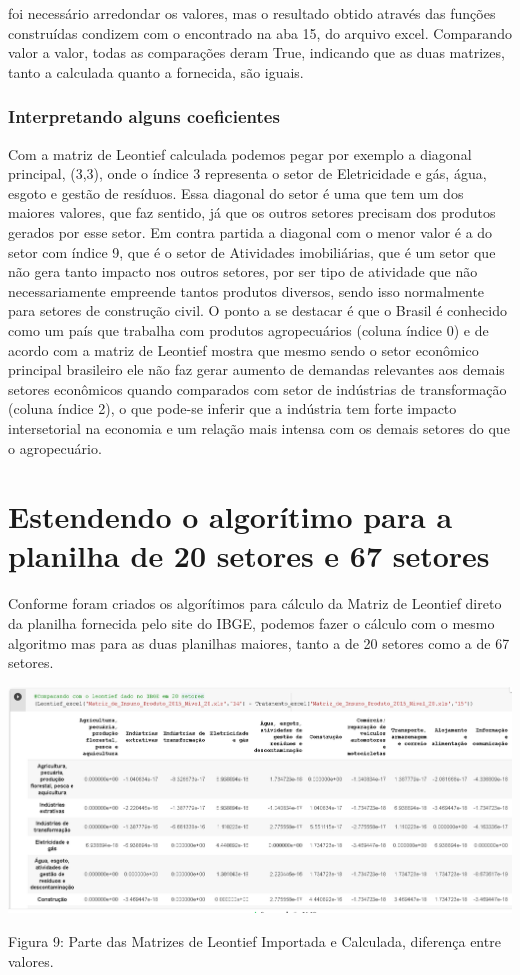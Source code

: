 \documentclass[a4paper, 12pt]{article}
\begin{document}
foi necessário arredondar os valores, mas o resultado obtido através das funções construídas condizem com o encontrado na aba 15, do arquivo excel. Comparando valor a valor, todas as comparações deram True, indicando que as duas matrizes, tanto a calculada quanto a fornecida, são iguais.

\subsubsection{Interpretando alguns coeficientes}

Com a matriz de Leontief calculada podemos pegar por exemplo a diagonal principal, (3,3), onde o índice 3 representa o setor de Eletricidade e gás, água, esgoto e gestão de resíduos. Essa diagonal do setor é uma que tem um dos maiores valores, que faz sentido, já que os outros setores precisam dos produtos gerados por esse setor.
Em contra partida a diagonal com o menor valor é a do setor com índice 9, que é o setor de Atividades imobiliárias, que é um setor que não gera tanto impacto nos outros setores, por ser tipo de atividade que não necessariamente empreende tantos produtos diversos, sendo isso normalmente para setores de construção civil.
O ponto a se destacar é que o Brasil é conhecido como um país que trabalha com produtos agropecuários (coluna índice 0) e de acordo com a matriz de Leontief mostra que mesmo sendo o setor econômico principal brasileiro ele não faz gerar aumento de demandas relevantes aos demais setores econômicos quando comparados com setor de indústrias de transformação (coluna índice 2), o que pode-se inferir que a indústria tem forte impacto intersetorial na economia e um relação mais intensa com os demais setores do que o agropecuário.


\section{Estendendo o algorítimo para a planilha de 20 setores e 67 setores}

Conforme foram criados os algorítimos para cálculo da Matriz de Leontief direto da planilha fornecida pelo site do IBGE, podemos fazer o cálculo com o mesmo algoritmo mas para as duas planilhas maiores, tanto a de 20 setores como a de 67 setores.

 \begin{center}
    \includegraphics[width=16cm]{saidaExtraA.PNG}
    
    Figura 9: Parte das Matrizes de Leontief Importada e Calculada, diferença entre valores.
    
\end{center}
\end{document}
